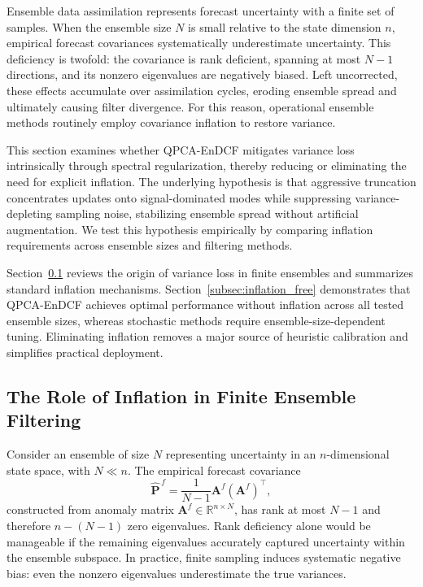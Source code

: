 \documentclass[11pt,a4paper]{article}
\begin{document}
Ensemble data assimilation represents forecast uncertainty with a finite set of samples. When the ensemble size $N$ is small relative to the state dimension $n$, empirical forecast covariances systematically underestimate uncertainty. This deficiency is twofold: the covariance is rank deficient, spanning at most $N\!-\!1$ directions, and its nonzero eigenvalues are negatively biased. Left uncorrected, these effects accumulate over assimilation cycles, eroding ensemble spread and ultimately causing filter divergence. For this reason, operational ensemble methods routinely employ covariance inflation to restore variance.

This section examines whether QPCA-EnDCF mitigates variance loss intrinsically through spectral regularization, thereby reducing or eliminating the need for explicit inflation. The underlying hypothesis is that aggressive truncation concentrates updates onto signal-dominated modes while suppressing variance-depleting sampling noise, stabilizing ensemble spread without artificial augmentation. We test this hypothesis empirically by comparing inflation requirements across ensemble sizes and filtering methods.

Section~\ref{subsec:inflation_problem} reviews the origin of variance loss in finite ensembles and summarizes standard inflation mechanisms. Section~\ref{subsec:inflation_free} demonstrates that QPCA-EnDCF achieves optimal performance without inflation across all tested ensemble sizes, whereas stochastic methods require ensemble-size-dependent tuning. Eliminating inflation removes a major source of heuristic calibration and simplifies practical deployment.

\subsection{The Role of Inflation in Finite Ensemble Filtering}
\label{subsec:inflation_problem}

Consider an ensemble of size $N$ representing uncertainty in an $n$-dimensional state space, with $N \ll n$. The empirical forecast covariance
\begin{equation}
\widehat{\mathbf{P}}^{\,f}
=
\frac{1}{N-1}\mathbf{A}^f(\mathbf{A}^f)^{\top},
\end{equation}
constructed from anomaly matrix $\mathbf{A}^f \in \mathbb{R}^{n\times N}$, has rank at most $N-1$ and therefore $n-(N-1)$ zero eigenvalues. Rank deficiency alone would be manageable if the remaining eigenvalues accurately captured uncertainty within the ensemble subspace. In practice, finite sampling induces systematic negative bias: even the nonzero eigenvalues underestimate the true variances.
\end{document}
